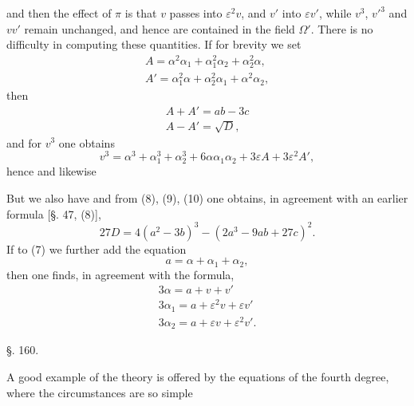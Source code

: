 and
then the effect of $\pi$ is that $v$ passes into $\varepsilon^2 v$, and $v'$ into $\varepsilon v'$, while $v^3$, $v'^3$ and $vv'$ remain unchanged, and hence are contained in the field $\Omega'$. There is no difficulty in computing these quantities. If for brevity we set
\[
\begin{gathered}
A = \alpha^2\alpha_1 + \alpha_1^2\alpha_2 + \alpha_2^2\alpha, \\
A' = \alpha_1^2\alpha + \alpha_2^2\alpha_1 + \alpha^2\alpha_2,
\end{gathered}
\]
then
\[
\begin{gathered}
A + A' = ab - 3c \\
A - A' = \sqrt{D},
\end{gathered}
\]
and for $v^3$ one obtains
\[
v^3 = \alpha^3 + \alpha_1^3 + \alpha_2^3 + 6\alpha\alpha_1\alpha_2 + 3\varepsilon A + 3\varepsilon^2 A',
\]
hence
and likewise

But we also have
and from (8), (9), (10) one obtains, in agreement with an earlier formula [\S. 47, (8)],
\[
27D = 4(a^2 - 3b)^3 - (2a^3 - 9ab + 27c)^2.
\]
If to (7) we further add the equation
\[
a = \alpha + \alpha_1 + \alpha_2,
\]
then one finds, in agreement with the  formula,
\[
\begin{gathered}
3\alpha = a + v + v' \\
3\alpha_1 = a + \varepsilon^2 v + \varepsilon v' \\
3\alpha_2 = a + \varepsilon v + \varepsilon^2 v'.
\end{gathered}
\]

\begin{center}
§. 160.

\end{center}

A good example of the  theory is offered by the equations of the fourth degree, where the circumstances are so simple

